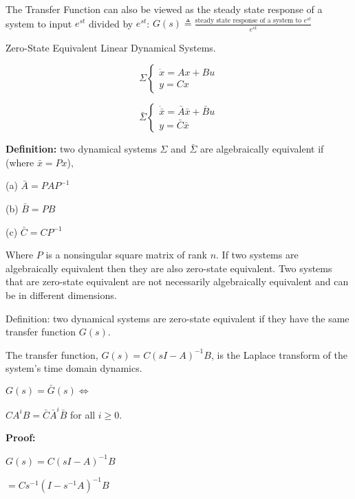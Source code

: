\documentclass[a4paper, 11 pt]{article}
\begin{document}
The Transfer Function can also be viewed as the steady state response of a system to input $e^{st}$ divided by $e^{st}$:
$ G(s) \triangleq \frac{\text{steady state response of a system to }e^{st}}{e^{st}}$

Zero-State Equivalent Linear Dynamical Systems.

\begin{multicols}{2}
\begin{equation}
    \Sigma  
    \left \{ 
      \begin{array}{ll}
        \dot{x} = Ax + Bu \\
        y = Cx
      \end{array}
      \right.
\end{equation}

  \begin{equation}
  \bar{\Sigma}
    \left \{ 
      \begin{array}{ll}
        \dot{\bar{x}} = \bar{A}\bar{x} + \bar{B}u \\
        y = \bar{C}\bar{x}
      \end{array}
      \right. 
\end{equation}
\end{multicols}

\textbf{Definition:} two dynamical systems $\Sigma$ and $\bar{\Sigma}$ are algebraically equivalent if (where $\bar{x} = Px$),

  (a) $\bar{A} = PAP^{-1}$

  (b) $\bar{B} = PB$

  (c) $\bar{C} = CP^{-1}$

  Where $P$ is a nonsingular square matrix of rank $n$. If two systems are algebraically equivalent then they are also zero-state equivalent. Two systems that are zero-state equivalent are not necessarily algebraically equivalent and can be in different dimensions. 

  Definition: two dynamical systems are zero-state equivalent if they have the same transfer function $G(s)$. 

  The transfer function, $G(s) = C(sI-A)^{-1}B$, is the Laplace transform of the system's time domain dynamics.

  $G(s) = \bar{G}(s) \iff$

  $CA^{i}B = \bar{C}\bar{A}^{i}\bar{B}$ for all $i \geq 0$.

  \textbf{Proof:}

  $G(s) = C(sI-A)^{-1}B$ 

  $=Cs^{-1}(I-s^{-1}A)^{-1}B$
\end{document}
